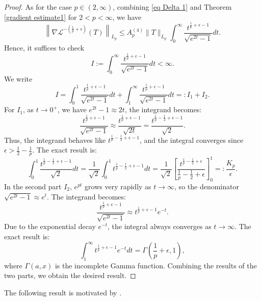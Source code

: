 \documentclass{amsbook}
\theoremstyle{definition}
\theoremstyle{remark}
\numberwithin{section}{chapter}
\numberwithin{equation}{chapter}
\newcommand{\1}{\mathbf{1}}
\begin{document}
\begin{proof}
As for the case $p\in (2,\infty)$, combining \eqref{eq Delta 1} and Theorem \ref{gradient estimate1} for $2<p<\infty$, we have
$$\left\|\nabla \mathcal{L}^{-(\frac{1}{p}+\epsilon)}(T)\right\|_{L_{p}}\leq A^{(4)}_{p}\|T\|_{L_{p}}\int_{0}^{\infty}\frac{t^{\frac{1}{p}+\epsilon-1}}{\sqrt{e^{2t}-1}}dt.$$
Hence, it suffices to check 
$$I:=\int_{0}^{\infty}\frac{t^{\frac{1}{p}+\epsilon-1}}{\sqrt{e^{2t}-1}}dt<\infty.$$ 
We write
$$I=\int_{0}^{1} \frac{t^{\frac{1}{p}+\epsilon-1}}{\sqrt{e^{2t}-1}} dt+\int_{1}^{\infty} \frac{t^{\frac{1}{p}+\epsilon-1}}{\sqrt{e^{2t}-1}}dt=:I_1+I_2.$$
For  $I_1$, as $t \to 0^+$, we have  $e^{2t} - 1 \approx 2t$, the integrand becomes:
$$
\frac{t^{\frac{1}{p}+\epsilon-1}}{\sqrt{e^{2t}-1}} \approx \frac{t^{\frac{1}{p}+\epsilon-1}}{\sqrt{2t}} = \frac{t^{\frac{1}{p}-\frac{1}{2}+\epsilon-1}}{\sqrt{2}}.
$$
Thus, the integrand behaves like $t^{\frac{1}{p}-\frac{1}{2}+\epsilon-1}$, and the integral converges since $ \epsilon > \frac{1}{2}-\frac{1}{p}$. The exact result is:
$$
\int_{0}^{1} \frac{t^{\frac{1}{p}-\frac{1}{2}+\epsilon-1}}{\sqrt{2}} dt = \frac{1}{\sqrt{2}} \int_{0}^{1} t^{\frac{1}{p}-\frac{1}{2}+\epsilon-1}dt = \frac{1}{\sqrt{2}} \left[ \frac{t^{\frac{1}{p}-\frac{1}{2}+\epsilon}}{\frac{1}{p}-\frac{1}{2}+\epsilon} \right]_0^1 =: \frac{K_p}{\epsilon}.
$$
In the second part $I_2$, $e^{pt}$ grows very rapidly as $t\to \infty$, so the denominator $\sqrt{e^{2t} - 1} \approx e^{t}$. The integrand becomes:
$$
\frac{t^{\frac{1}{p}+\epsilon-1}}{\sqrt{e^{2t} - 1}} \approx t^{\frac{1}{p}+\epsilon-1} e^{-t}.
$$
Due to the exponential decay $e^{-t}$, the integral always converges as $t \to \infty$. The exact result is:
$$
\int_{1}^{\infty} t^{\frac{1}{p}+\epsilon-1} e^{-t} dt = \Gamma\left(\frac{1}{p}+\epsilon, 1\right),
$$
where $\Gamma(a, x)$ is the incomplete Gamma function.
Combining the results of the two parts, we obtain the desired result.
\end{proof}





The following result is motivated by \cite[Theorem 9.22]{ODo2014}. 
\end{document}
